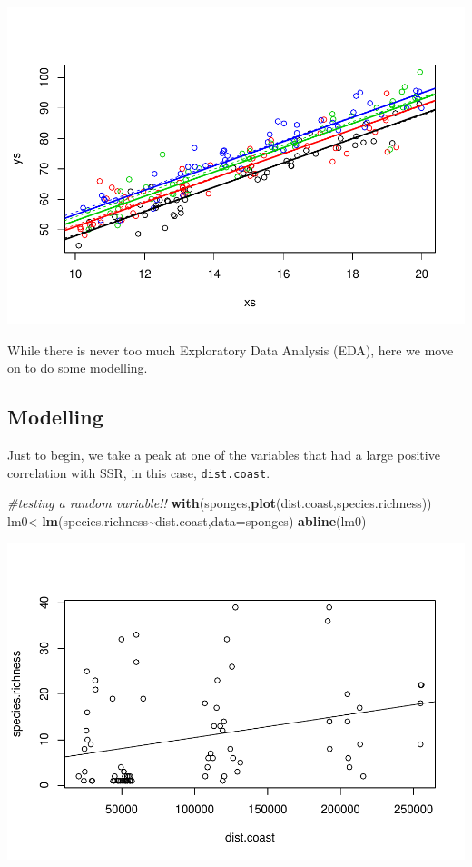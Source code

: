 \documentclass[
]{book}
\newenvironment{Shaded}{\begin{snugshade}}{\end{snugshade}}
\newcommand{\AttributeTok}[1]{\textcolor[rgb]{0.13,0.29,0.53}{#1}}
\newcommand{\CommentTok}[1]{\textcolor[rgb]{0.56,0.35,0.01}{\textit{#1}}}
\newcommand{\FunctionTok}[1]{\textcolor[rgb]{0.13,0.29,0.53}{\textbf{#1}}}
\newcommand{\NormalTok}[1]{#1}
\newcommand{\OtherTok}[1]{\textcolor[rgb]{0.56,0.35,0.01}{#1}}
\newcommand{\SpecialCharTok}[1]{\textcolor[rgb]{0.81,0.36,0.00}{\textbf{#1}}}
\begin{document}
\includegraphics{ECOMODbook_files/figure-latex/unnamed-chunk-92-1.pdf}

While there is never too much Exploratory Data Analysis (EDA), here we move on to do some modelling.

\hypertarget{modelling}{%
\subsection{Modelling}\label{modelling}}

Just to begin, we take a peak at one of the variables that had a large positive correlation with SSR, in this case, \texttt{dist.coast}.

\begin{Shaded}
\begin{Highlighting}[]
\CommentTok{\#testing a random variable!!}
\FunctionTok{with}\NormalTok{(sponges,}\FunctionTok{plot}\NormalTok{(dist.coast,species.richness))}
\NormalTok{lm0}\OtherTok{\textless{}{-}}\FunctionTok{lm}\NormalTok{(species.richness}\SpecialCharTok{\textasciitilde{}}\NormalTok{dist.coast,}\AttributeTok{data=}\NormalTok{sponges)}
\FunctionTok{abline}\NormalTok{(lm0)}
\end{Highlighting}
\end{Shaded}

\includegraphics{ECOMODbook_files/figure-latex/unnamed-chunk-93-1.pdf}
\end{document}
